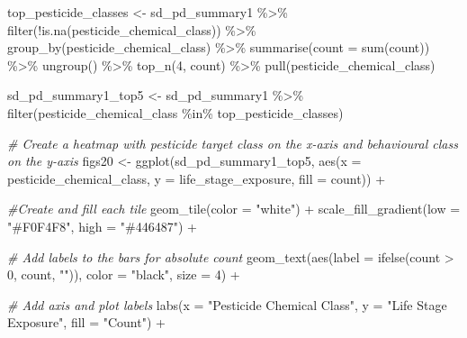 \documentclass[
]{article}
\newenvironment{Shaded}{\begin{snugshade}}{\end{snugshade}}
\newcommand{\AttributeTok}[1]{\textcolor[rgb]{0.77,0.63,0.00}{#1}}
\newcommand{\CommentTok}[1]{\textcolor[rgb]{0.56,0.35,0.01}{\textit{#1}}}
\newcommand{\DecValTok}[1]{\textcolor[rgb]{0.00,0.00,0.81}{#1}}
\newcommand{\FunctionTok}[1]{\textcolor[rgb]{0.00,0.00,0.00}{#1}}
\newcommand{\NormalTok}[1]{#1}
\newcommand{\OtherTok}[1]{\textcolor[rgb]{0.56,0.35,0.01}{#1}}
\newcommand{\SpecialCharTok}[1]{\textcolor[rgb]{0.00,0.00,0.00}{#1}}
\newcommand{\StringTok}[1]{\textcolor[rgb]{0.31,0.60,0.02}{#1}}
\begin{document}
\begin{Shaded}
\begin{Highlighting}[]
\NormalTok{top\_pesticide\_classes }\OtherTok{\textless{}{-}}\NormalTok{ sd\_pd\_summary1 }\SpecialCharTok{\%\textgreater{}\%}
  \FunctionTok{filter}\NormalTok{(}\SpecialCharTok{!}\FunctionTok{is.na}\NormalTok{(pesticide\_chemical\_class)) }\SpecialCharTok{\%\textgreater{}\%}
  \FunctionTok{group\_by}\NormalTok{(pesticide\_chemical\_class) }\SpecialCharTok{\%\textgreater{}\%}
  \FunctionTok{summarise}\NormalTok{(}\AttributeTok{count =} \FunctionTok{sum}\NormalTok{(count)) }\SpecialCharTok{\%\textgreater{}\%}
  \FunctionTok{ungroup}\NormalTok{() }\SpecialCharTok{\%\textgreater{}\%}
  \FunctionTok{top\_n}\NormalTok{(}\DecValTok{4}\NormalTok{, count) }\SpecialCharTok{\%\textgreater{}\%}
  \FunctionTok{pull}\NormalTok{(pesticide\_chemical\_class)}

\NormalTok{sd\_pd\_summary1\_top5 }\OtherTok{\textless{}{-}}\NormalTok{ sd\_pd\_summary1 }\SpecialCharTok{\%\textgreater{}\%}
  \FunctionTok{filter}\NormalTok{(pesticide\_chemical\_class }\SpecialCharTok{\%in\%}\NormalTok{ top\_pesticide\_classes)}

\CommentTok{\# Create a heatmap with pesticide target class on the x{-}axis and behavioural class on the y{-}axis}
\NormalTok{figs20 }\OtherTok{\textless{}{-}} \FunctionTok{ggplot}\NormalTok{(sd\_pd\_summary1\_top5, }\FunctionTok{aes}\NormalTok{(}\AttributeTok{x =}\NormalTok{ pesticide\_chemical\_class, }\AttributeTok{y =}\NormalTok{ life\_stage\_exposure, }\AttributeTok{fill =}\NormalTok{ count)) }\SpecialCharTok{+}
  
  \CommentTok{\#Create and fill each tile}
  \FunctionTok{geom\_tile}\NormalTok{(}\AttributeTok{color =} \StringTok{"white"}\NormalTok{) }\SpecialCharTok{+}
  \FunctionTok{scale\_fill\_gradient}\NormalTok{(}\AttributeTok{low =} \StringTok{"\#F0F4F8"}\NormalTok{, }\AttributeTok{high =} \StringTok{"\#446487"}\NormalTok{) }\SpecialCharTok{+}
  
  \CommentTok{\# Add labels to the bars for absolute count }
  \FunctionTok{geom\_text}\NormalTok{(}\FunctionTok{aes}\NormalTok{(}\AttributeTok{label =} \FunctionTok{ifelse}\NormalTok{(count }\SpecialCharTok{\textgreater{}} \DecValTok{0}\NormalTok{, count, }\StringTok{""}\NormalTok{)), }\AttributeTok{color =} \StringTok{"black"}\NormalTok{, }\AttributeTok{size =} \DecValTok{4}\NormalTok{) }\SpecialCharTok{+}
  
  \CommentTok{\# Add axis and plot labels}
  \FunctionTok{labs}\NormalTok{(}\AttributeTok{x =} \StringTok{"Pesticide Chemical Class"}\NormalTok{, }\AttributeTok{y =} \StringTok{"Life Stage Exposure"}\NormalTok{, }\AttributeTok{fill =} \StringTok{"Count"}\NormalTok{) }\SpecialCharTok{+}
  

\end{Highlighting}
\end{Shaded}
\end{document}

